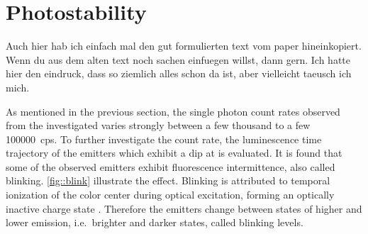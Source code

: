 



	\section{Photostability} \label{subsec::photostab}

		\begin{remark}
			Auch hier hab ich einfach mal den gut formulierten text vom paper hineinkopiert. Wenn du aus dem alten text noch sachen einfuegen willst, dann gern. Ich hatte hier den eindruck, dass so ziemlich alles schon da ist, aber vielleicht taeusch ich mich.
		\end{remark}

		As mentioned in the previous section, the single photon count rates observed from the investigated \sivs varies strongly between a few thousand to a few \SI{100000}{cps}.
		To further investigate the count rate, the luminescence time trajectory of the emitters which exhibit a dip at \gtz is evaluated.
		It is found that some of the observed emitters exhibit fluorescence intermittence, also called blinking. \autoref{fig::blink} illustrate the effect.
		Blinking is attributed to temporal ionization of the color center during optical excitation, forming an optically inactive charge state \cite{Jantzen2016,Neu2012a,Gali2013}.
		Therefore the emitters change between states of higher and lower emission, i.e.\ brighter and darker states, called blinking levels.

